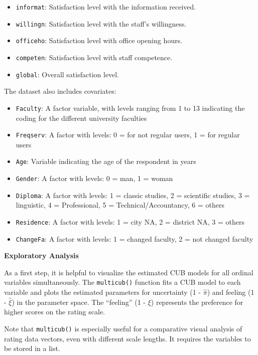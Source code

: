 \documentclass[
  letterpaper,
  DIV=11,
  numbers=noendperiod]{scrartcl}
\begin{document}
\begin{itemize}
\item
  \texttt{informat}: Satisfaction level with the information received.
\item
  \texttt{willingn}: Satisfaction level with the staff's willingness.
\item
  \texttt{officeho}: Satisfaction level with office opening hours.
\item
  \texttt{competen}: Satisfaction level with staff competence.
\item
  \texttt{global}: Overall satisfaction level.
\end{itemize}

The dataset also includes covariates:

\begin{itemize}
\item
  \texttt{Faculty}: A factor variable, with levels ranging from 1 to 13
  indicating the coding for the different university faculties
\item
  \texttt{Freqserv}: A factor with levels: 0 = for not regular users, 1
  = for regular users
\item
  \texttt{Age}: Variable indicating the age of the respondent in years
\item
  \texttt{Gender}: A factor with levels: 0 = man, 1 = woman
\item
  \texttt{Diploma}: A factor with levels: 1 = classic studies, 2 =
  scientific studies, 3 = linguistic, 4 = Professional, 5 =
  Technical/Accountancy, 6 = others
\item
  \texttt{Residence}: A factor with levels: 1 = city NA, 2 = district
  NA, 3 = others
\item
  \texttt{ChangeFa}: A factor with levels: 1 = changed faculty, 2 = not
  changed faculty
\end{itemize}

\textbf{Exploratory Analysis}

As a first step, it is helpful to visualize the estimated CUB models for
all ordinal variables simultaneously. The \texttt{multicub()} function
fits a CUB model to each variable and plots the estimated parameters for
uncertainty (1 - \(\hat{\pi}\)) and feeling (1 - \(\hat{\xi}\)) in the
parameter space. The ``feeling'' (1 - \(\xi\)) represents the preference
for higher scores on the rating scale.

Note that \texttt{multicub()} is especially useful for a comparative
visual analysis of rating data vectors, even with different scale
lengths. It requires the variables to be stored in a list.
\end{document}
